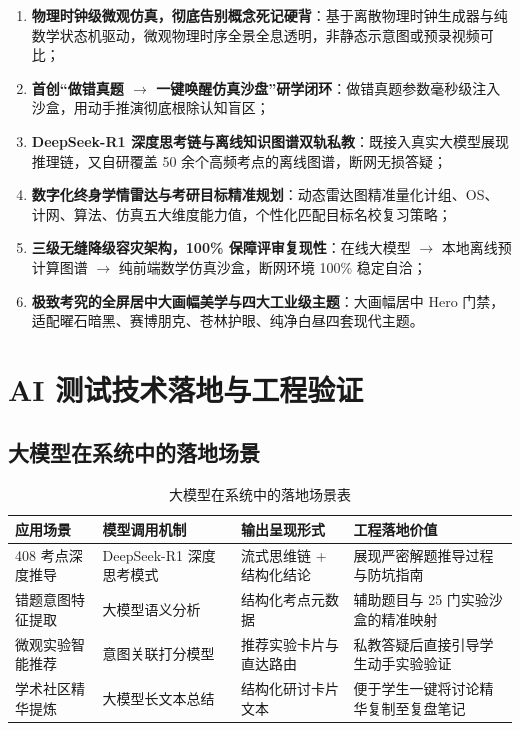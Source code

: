 \documentclass[UTF8,a4paper,11pt]{ctexart}
\begin{document}
\begin{enumerate}
    \item \textbf{物理时钟级微观仿真，彻底告别概念死记硬背}：基于离散物理时钟生成器与纯数学状态机驱动，微观物理时序全景全息透明，非静态示意图或预录视频可比；
    \item \textbf{首创“做错真题 $\rightarrow$ 一键唤醒仿真沙盘”研学闭环}：做错真题参数毫秒级注入沙盒，用动手推演彻底根除认知盲区；
    \item \textbf{DeepSeek-R1 深度思考链与离线知识图谱双轨私教}：既接入真实大模型展现推理链，又自研覆盖 50 余个高频考点的离线图谱，断网无损答疑；
    \item \textbf{数字化终身学情雷达与考研目标精准规划}：动态雷达图精准量化计组、OS、计网、算法、仿真五大维度能力值，个性化匹配目标名校复习策略；
    \item \textbf{三级无缝降级容灾架构，100\% 保障评审复现性}：在线大模型 $\rightarrow$ 本地离线预计算图谱 $\rightarrow$ 纯前端数学仿真沙盒，断网环境 100\% 稳定自洽；
    \item \textbf{极致考究的全屏居中大画幅美学与四大工业级主题}：大画幅居中 Hero 门禁，适配曜石暗黑、赛博朋克、苍林护眼、纯净白昼四套现代主题。
\end{enumerate}

\section{AI 测试技术落地与工程验证}

\subsection{大模型在系统中的落地场景}

\begin{table}[htbp]
\centering
\small
\caption{大模型在系统中的落地场景表}
\begin{tabularx}{\textwidth}{p{3.2cm}p{3.5cm}p{3cm}X}
\toprule
\textbf{应用场景} & \textbf{模型调用机制} & \textbf{输出呈现形式} & \textbf{工程落地价值} \\
\midrule
408 考点深度推导 & DeepSeek-R1 深度思考模式 & 流式思维链 + 结构化结论 & 展现严密解题推导过程与防坑指南 \\
错题意图特征提取 & 大模型语义分析 & 结构化考点元数据 & 辅助题目与 25 门实验沙盒的精准映射 \\
微观实验智能推荐 & 意图关联打分模型 & 推荐实验卡片与直达路由 & 私教答疑后直接引导学生动手实验验证 \\
学术社区精华提炼 & 大模型长文本总结 & 结构化研讨卡片文本 & 便于学生一键将讨论精华复制至复盘笔记 \\
\bottomrule
\end{tabularx}
\end{table}
\end{document}
